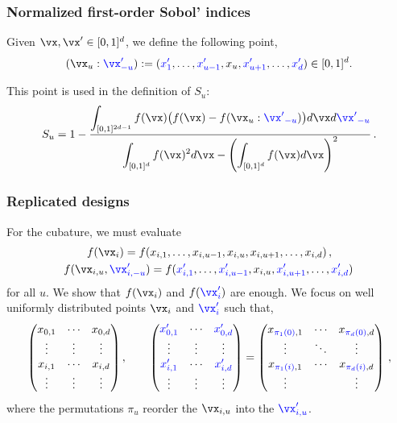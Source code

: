 \documentclass[11pt,compress]{beamer} %
\begin{document}
\begin{frame}
\frametitle{Normalized first-order Sobol' indices}
Given $\vx,\vx'\in [0,1]^d$, we define the following point,
\begin{gather*}
(\vx_u:{\color{blue}\vx'_{-u}}) := 
({\color{blue}x'_1},\dots,{\color{blue}x'_{u-1}},x_u,{\color{blue}x'_{u+1}},\dots,{\color{blue}x'_d})\in
[0,1]^d.
\end{gather*}

This point is used in the definition of $S_u$:
\begin{equation*}
S_{u}=1-\frac{\displaystyle \int_{[0,1]^{2d-1}}f(\vx)\bigl (f(\vx) - 
	f(\vx_u:{\color{blue}{\vx'}_{-u}})\bigr) d\vx 
	d{\color{blue}{\vx'}_{-u}}}{\displaystyle\int_{[0,1]^d} f(\vx)^2 d{\vx}-\left(\int_{[0,1]^d} 
	f(\vx) 
	d{\vx}\right)^2}\, .
\end{equation*}
\end{frame}




\begin{frame}
\frametitle{Replicated designs}
For the cubature, we must evaluate 
\begin{gather*}
f(\vx_i)=f(x_{i,1},\dots,x_{i,u-1},x_{i,u},x_{i,u+1},\dots,x_{i,d})\, ,\\
f(\vx_{i,u},{\color{blue}\vx'_{i,-u}})=f({\color{blue}x'_{i,1}},\dots,{\color{blue}x'_{i,u-1}},
x_{i,u},{\color{blue}x'_{i,u+1}},\dots,{\color{blue}x'_{i,d}})\,
\end{gather*}
\alert{for all $u$}.  We show that $f(\vx_i)$ and $f({\color{blue}\vx'_{i}})$ are enough.  We 
focus on well 
uniformly distributed points $\vx_i$ and ${\color{blue}\vx'_i}$ such that,
\begin{equation*}
\begin{pmatrix}
x_{0,1} & \cdots & x_{0,d} \\
\vdots & \vdots & \vdots \\
x_{i,1} & \cdots & x_{i,d} \\
\vdots & \vdots & \vdots
\end{pmatrix},\qquad
\begin{pmatrix}
{\color{blue}x'_{0,1}} & \cdots & {\color{blue}x'_{0,d}} \\
\vdots & \vdots & \vdots \\
{\color{blue}x'_{i,1}} & \cdots & {\color{blue}x'_{i,d}} \\
\vdots & \vdots & \vdots
\end{pmatrix}=
\begin{pmatrix}
x_{{\color{blue}\pi_1(0)},1} & \cdots & x_{{\color{blue}\pi_d(0)},d} \\
\vdots & \ddots & \vdots \\
x_{{\color{blue}\pi_1(i)},1} & \cdots & x_{{\color{blue}\pi_d(i)},d} \\
\vdots &  & \vdots \\
\end{pmatrix}\, ,
\end{equation*}
where the permutations $\pi_u$  reorder the $\vx_{i,u}$ into the 
$\color{blue}\vx'_{i,u}$.
\end{frame}
\end{document}
